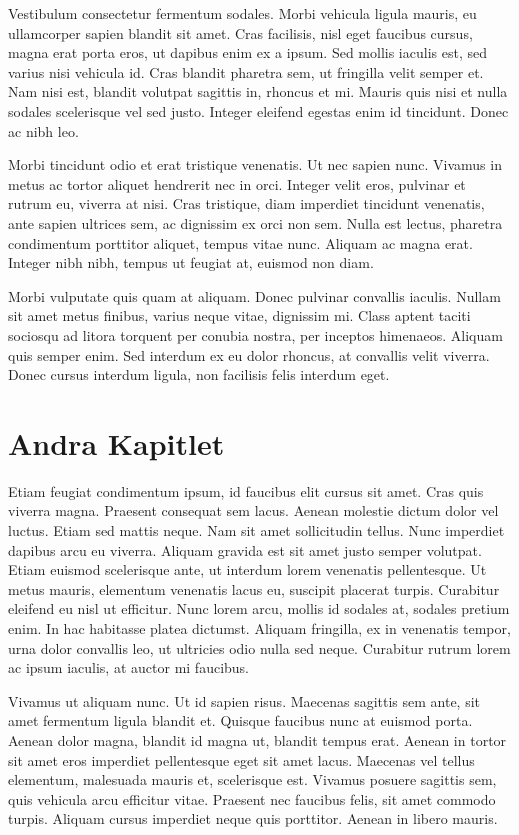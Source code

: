 \documentclass[a4paper,10pt]{article}
\begin{document}
Vestibulum consectetur fermentum sodales. Morbi vehicula ligula mauris, eu ullamcorper sapien blandit sit amet. Cras facilisis, nisl eget faucibus cursus, magna erat porta eros, ut dapibus enim ex a ipsum. Sed mollis iaculis est, sed varius nisi vehicula id. Cras blandit pharetra sem, ut fringilla velit semper et. Nam nisi est, blandit volutpat sagittis in, rhoncus et mi. Mauris quis nisi et nulla sodales scelerisque vel sed justo. Integer eleifend egestas enim id tincidunt. Donec ac nibh leo.

Morbi tincidunt odio et erat tristique venenatis. Ut nec sapien nunc. Vivamus in metus ac tortor aliquet hendrerit nec in orci. Integer velit eros, pulvinar et rutrum eu, viverra at nisi. Cras tristique, diam imperdiet tincidunt venenatis, ante sapien ultrices sem, ac dignissim ex orci non sem. Nulla est lectus, pharetra condimentum porttitor aliquet, tempus vitae nunc. Aliquam ac magna erat. Integer nibh nibh, tempus ut feugiat at, euismod non diam.

Morbi vulputate quis quam at aliquam. Donec pulvinar convallis iaculis. Nullam sit amet metus finibus, varius neque vitae, dignissim mi. Class aptent taciti sociosqu ad litora torquent per conubia nostra, per inceptos himenaeos. Aliquam quis semper enim. Sed interdum ex eu dolor rhoncus, at convallis velit viverra. Donec cursus interdum ligula, non facilisis felis interdum eget.
\section{Andra Kapitlet}
Etiam feugiat condimentum ipsum, id faucibus elit cursus sit amet. Cras quis viverra magna. Praesent consequat sem lacus. Aenean molestie dictum dolor vel luctus. Etiam sed mattis neque. Nam sit amet sollicitudin tellus. Nunc imperdiet dapibus arcu eu viverra. Aliquam gravida est sit amet justo semper volutpat. Etiam euismod scelerisque ante, ut interdum lorem venenatis pellentesque. Ut metus mauris, elementum venenatis lacus eu, suscipit placerat turpis. Curabitur eleifend eu nisl ut efficitur. Nunc lorem arcu, mollis id sodales at, sodales pretium enim. In hac habitasse platea dictumst. Aliquam fringilla, ex in venenatis tempor, urna dolor convallis leo, ut ultricies odio nulla sed neque. Curabitur rutrum lorem ac ipsum iaculis, at auctor mi faucibus.

Vivamus ut aliquam nunc. Ut id sapien risus. Maecenas sagittis sem ante, sit amet fermentum ligula blandit et. Quisque faucibus nunc at euismod porta. Aenean dolor magna, blandit id magna ut, blandit tempus erat. Aenean in tortor sit amet eros imperdiet pellentesque eget sit amet lacus. Maecenas vel tellus elementum, malesuada mauris et, scelerisque est. Vivamus posuere sagittis sem, quis vehicula arcu efficitur vitae. Praesent nec faucibus felis, sit amet commodo turpis. Aliquam cursus imperdiet neque quis porttitor. Aenean in libero mauris.
\end{document}
